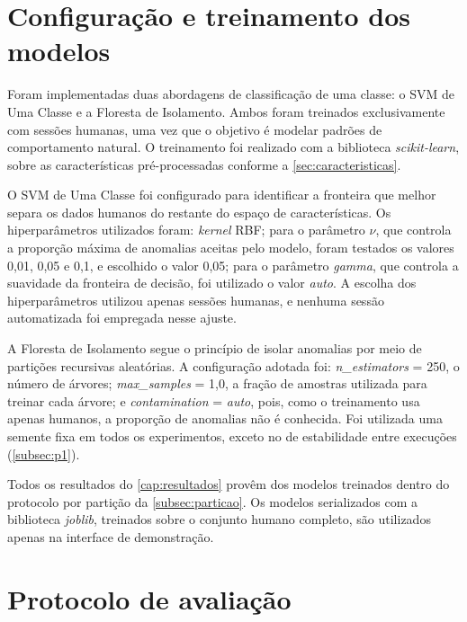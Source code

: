 \section{Configuração e treinamento dos modelos}
\label{sec:treinamento}

Foram implementadas duas abordagens de classificação de uma classe: o SVM de Uma Classe e a Floresta de Isolamento. Ambos foram treinados exclusivamente com sessões humanas, uma vez que o objetivo é modelar padrões de comportamento natural. O treinamento foi realizado com a biblioteca \textit{scikit-learn}, sobre as características pré-processadas conforme a \autoref{sec:caracteristicas}.

O SVM de Uma Classe foi configurado para identificar a fronteira que melhor separa os dados humanos do restante do espaço de características. Os hiperparâmetros utilizados foram: \textit{kernel} RBF; para o parâmetro $\nu$, que controla a proporção máxima de anomalias aceitas pelo modelo, foram testados os valores 0,01, 0,05 e 0,1, e escolhido o valor 0,05; para o parâmetro \textit{gamma}, que controla a suavidade da fronteira de decisão, foi utilizado o valor \textit{auto}. A escolha dos hiperparâmetros utilizou apenas sessões humanas, e nenhuma sessão automatizada foi empregada nesse ajuste.

A Floresta de Isolamento segue o princípio de isolar anomalias por meio de partições recursivas aleatórias. A configuração adotada foi: \textit{n\_estimators} = 250, o número de árvores; \textit{max\_samples} = 1,0, a fração de amostras utilizada para treinar cada árvore; e \textit{contamination} = \textit{auto}, pois, como o treinamento usa apenas humanos, a proporção de anomalias não é conhecida. Foi utilizada uma semente fixa em todos os experimentos, exceto no de estabilidade entre execuções (\autoref{subsec:p1}).

Todos os resultados do \autoref{cap:resultados} provêm dos modelos treinados dentro do protocolo por partição da \autoref{subsec:particao}. Os modelos serializados com a biblioteca \textit{joblib}, treinados sobre o conjunto humano completo, são utilizados apenas na interface de demonstração.

\section{Protocolo de avaliação}
\label{sec:protocolo}

